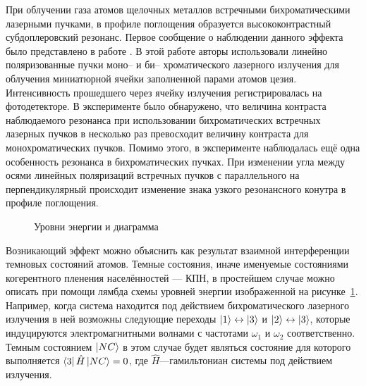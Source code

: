 
{\actuality}При облучении газа атомов щелочных металлов встречными бихроматическими лазерными пучками, в профиле поглощения образуется высококонтрастный субдоплеровский резонанс.
Первое сообщение о наблюдении данного эффекта было представлено в работе \autocite{hafiz2016}.
В этой работе авторы использовали линейно поляризованные пучки моно-- и би-- хроматического лазерного излучения для облучения миниатюрной ячейки заполненной парами атомов цезия.
Интенсивность прошедшего через ячейку излучения регистрировалась на фотодетекторе.
В эксперименте было обнаружено, что величина контраста наблюдаемого резонанса при использовании бихроматических встречных лазерных пучков в несколько раз превосходит величину контраста для монохроматических пучков. 
Помимо этого, в эксперименте наблюдалась ещё одна особенность резонанса в бихроматических пучках.
При изменении угла между осями линейных поляризаций встречных пучков с параллельного на перпендикулярный происходит изменение знака узкого резонансного конутра в профиле поглощения.

\begin{figure}[ht]
    \caption[Этот текст попадает в названия рисунков в списке рисунков]{Уровни энергии и диаграмма}\label{fig:lambda}
\end{figure}
Возникающий эффект можно объяснить как результат взаимной интерференции темновых состояний атомов.
Темные состояния, иначе именуемые состояниями когерентного пленения населённостей --- КПН, в простейшем случае можно описать при помощи лямбда схемы уровней энергии изображенной на рисунке~\cref{fig:lambda}.
Например, когда система находится под действием бихроматического лазерного излучения в ней возможны следующие переходы $\ket{1}\leftrightarrow\ket{3}$ и $\ket{2}\leftrightarrow\ket{3}$, которые индуцируются электромагнитными волнами с частотами $\omega_1$ и $\omega_2$ соответственно.
Темным состоянием $\ket{NC}$ в этом случае будет являться состояние для которого выполняется $\bra{3}\hat{H}\ket{NC}=0$, где $\hat{H}$---гамильтониан системы под действием излучения.


